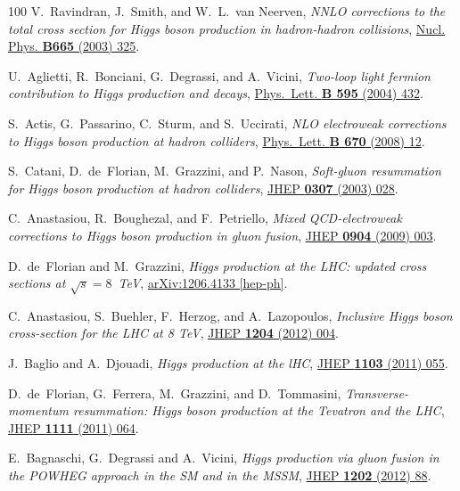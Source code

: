 \documentclass[final,3p,times,twocolumn]{elsarticle}
\begin{document}
\begin{thebibliography}{100}
{V.~Ravindran, J.~Smith, and W.~L.~van Neerven}, {\em {NNLO corrections to the
  total cross section for Higgs boson production in hadron-hadron collisions}},
  \href{http://dx.doi.org/10.1016/S0550-3213(03)00457-7}{Nucl. Phys. {\bfseries
  B665} (2003) 325}.

U.~Aglietti, R.~Bonciani, G.~Degrassi, and A.~Vicini, {\em {Two-loop light
  fermion contribution to Higgs production and decays}},
  \href{http://dx.doi.org/10.1016/j.physletb.2004.06.063}{Phys.~Lett.
  {\bfseries B 595} (2004) 432}.

S.~Actis, G.~Passarino, C.~Sturm, and S.~Uccirati, {\em {NLO electroweak
  corrections to Higgs boson production at hadron colliders}},
  \href{http://dx.doi.org/10.1016/j.physletb.2008.10.018}{Phys.~Lett.
  {\bfseries B 670} (2008) 12}.

S.~Catani, D.~de~Florian, M.~Grazzini, and P.~Nason, {\em {Soft-gluon
  resummation for Higgs boson production at hadron colliders}},
  \href{http://dx.doi.org/10.1088/1126-6708/2003/07/028}{JHEP {\bfseries 0307}
  (2003) 028}.

{C.~Anastasiou, R.~Boughezal, and F.~Petriello}, {\em {Mixed QCD-electroweak
  corrections to Higgs boson production in gluon fusion}},
  \href{http://dx.doi.org/10.1088/1126-6708/2009/04/003}{JHEP {\bfseries 0904}
  (2009) 003}.

D.~de~Florian and M.~Grazzini, {\em {Higgs production at the LHC: updated cross
  sections at $\sqrt{s} = 8$~TeV}},
\href{http://arxiv.org/abs/1206.4133}{{\ttfamily arXiv:1206.4133 [hep-ph]}}.

C.~Anastasiou, S.~Buehler, F.~Herzog, and A.~Lazopoulos, {\em {Inclusive Higgs
  boson cross-section for the LHC at 8 TeV}},
  \href{http://dx.doi.org/10.1007/JHEP04(2012)004}{JHEP {\bfseries 1204} (2012)
  004}.

J.~Baglio and A.~Djouadi, {\em {Higgs production at the lHC}},
  \href{http://dx.doi.org/10.1007/JHEP03(2011)055}{JHEP {\bfseries 1103} (2011)
  055}.

D.~de~Florian, G.~Ferrera, M.~Grazzini, and D.~Tommasini, {\em
  {Transverse-momentum resummation: Higgs boson production at the Tevatron and
  the LHC}}, \href{http://dx.doi.org/10.1007/JHEP11(2011)064}{JHEP {\bfseries
  1111} (2011) 064}.

E.~Bagnaschi, G.~Degrassi and A.~Vicini, {\em {Higgs production via gluon
  fusion in the POWHEG approach in the SM and in the MSSM}},
  \href{http://dx.doi.org/10.1007/JHEP02(2012)088}{JHEP {\bfseries 1202} (2012)
  88}.


\end{thebibliography}
\end{document}
